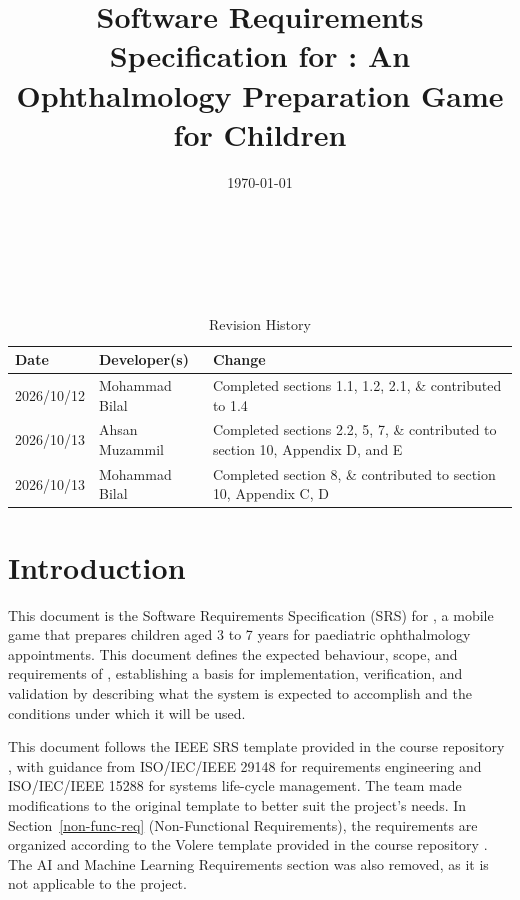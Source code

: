\documentclass[12pt]{article}
\begin{document}
\title{Software Requirements Specification for \progname: An Ophthalmology Preparation Game for Children} 
\author{\authname}
\date{\today}
	
\maketitle

~\newpage


\tableofcontents

~\newpage

\begin{table}[hp]
\caption{Revision History} \label{TblRevisionHistory}
\begin{tabularx}{\textwidth}{llX}
\toprule
\textbf{Date} & \textbf{Developer(s)} & \textbf{Change}\\
\midrule
2026/10/12 & Mohammad Bilal & Completed sections 1.1, 1.2, 2.1, \& contributed to 1.4 \\
2026/10/13 & Ahsan Muzammil & Completed sections 2.2, 5, 7, \& contributed to section 10, Appendix D, and E \\
2026/10/13 & Mohammad Bilal & Completed section 8, \& contributed to section 10, Appendix C, D \\
\bottomrule
\end{tabularx}
\end{table}

\newpage


\section{Introduction} 

This document is the Software Requirements Specification (SRS) for \progname{}, a mobile game
that prepares children aged 3 to 7 years for paediatric ophthalmology appointments.
This document defines the expected behaviour, scope, and requirements of \progname{},
establishing a basis for implementation, verification, and validation by describing what the system
is expected to accomplish and the conditions under which it will be used.

This document follows the IEEE SRS template provided in the course repository \cite{SmithCapTemplate},
with guidance from ISO/IEC/IEEE 29148 \cite{ISOIECIEEE291482018} for requirements engineering and
ISO/IEC/IEEE 15288 \cite{ISOIECIEEE152882023} for systems life-cycle management. The team made
modifications to the original template to better suit the project's needs. In Section~\ref{non-func-req}
(Non-Functional Requirements), the requirements are organized according to the Volere template provided
in the course repository \cite{SmithCapTemplate}. The AI and Machine Learning Requirements section was
also removed, as it is not applicable to the project.
\end{document}
